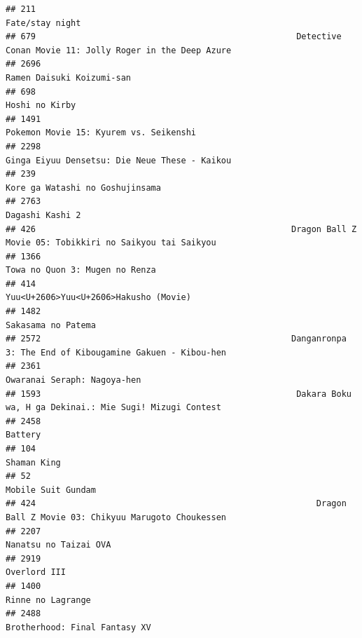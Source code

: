 \documentclass[
]{article}
\begin{document}
\begin{verbatim}
## 211                                                                                            Fate/stay night
## 679                                                    Detective Conan Movie 11: Jolly Roger in the Deep Azure
## 2696                                                                                 Ramen Daisuki Koizumi-san
## 698                                                                                             Hoshi no Kirby
## 1491                                                                    Pokemon Movie 15: Kyurem vs. Seikenshi
## 2298                                                             Ginga Eiyuu Densetsu: Die Neue These - Kaikou
## 239                                                                            Kore ga Watashi no Goshujinsama
## 2763                                                                                           Dagashi Kashi 2
## 426                                                   Dragon Ball Z Movie 05: Tobikkiri no Saikyou tai Saikyou
## 1366                                                                            Towa no Quon 3: Mugen no Renza
## 414                                                                      Yuu<U+2606>Yuu<U+2606>Hakusho (Movie)
## 1482                                                                                        Sakasama no Patema
## 2572                                                  Danganronpa 3: The End of Kibougamine Gakuen - Kibou-hen
## 2361                                                                               Owaranai Seraph: Nagoya-hen
## 1593                                                   Dakara Boku wa, H ga Dekinai.: Mie Sugi! Mizugi Contest
## 2458                                                                                                   Battery
## 104                                                                                                Shaman King
## 52                                                                                          Mobile Suit Gundam
## 424                                                        Dragon Ball Z Movie 03: Chikyuu Marugoto Choukessen
## 2207                                                                                     Nanatsu no Taizai OVA
## 2919                                                                                              Overlord III
## 1400                                                                                         Rinne no Lagrange
## 2488                                                                             Brotherhood: Final Fantasy XV

\end{verbatim}
\end{document}
